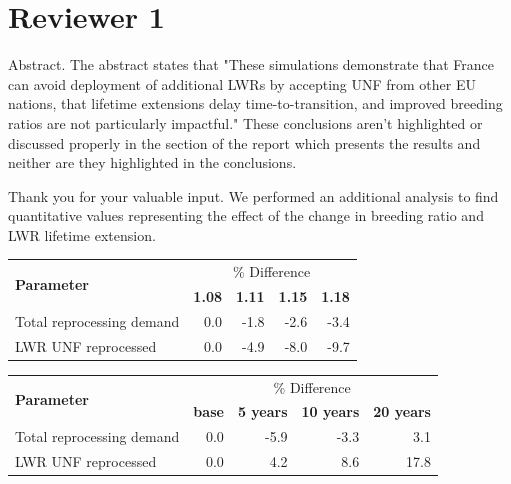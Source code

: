 \documentclass[answers,11pt]{exam}
\begin{document}
\section*{Reviewer 1}
\begin{questions}

        \question Abstract. The abstract states that "These simulations 
        demonstrate that France can avoid deployment of additional LWRs by 
        accepting UNF from other EU nations, that lifetime extensions delay 
        time-to-transition, and improved breeding ratios are not particularly 
        impactful." These conclusions aren't highlighted or discussed properly 
        in the section of the report which presents the results and neither are 
        they highlighted in the conclusions.  

        \begin{solution}
        	Thank you for your valuable input. We performed an additional
        	analysis to find quantitative values representing the effect
        	of the change in breeding ratio and LWR lifetime extension.
        	 
        	 \begin{tabular}{lrrrr}
        	 	\hline
        	 	\multirow{2}{*}{\textbf{Parameter}} & \multicolumn{4}{c}{\% Difference} \\
        	 	& \textbf{1.08}& \textbf{1.11} & \textbf{1.15} & \textbf{1.18} \\
        	 	\hline
        	 	Total reprocessing demand & 0.0 & -1.8 & -2.6 & -3.4 \\ 
        	 	LWR UNF reprocessed & 0.0  & -4.9 & -8.0 & -9.7 \\
        	 	\hline
        	 \end{tabular}
        	 
        	 \begin{tabular}{lrrrr}
        	 	\hline
        	 	\multirow{2}{*}{\textbf{Parameter}} & \multicolumn{4}{c}{\% Difference} \\
        	 	& \textbf{base}& \textbf{5 years} & \textbf{10 years} & \textbf{20 years} \\
        	 	\hline
        	 	Total reprocessing demand & 0.0 & -5.9 & -3.3 & 3.1 \\
        	 	LWR UNF reprocessed & 0.0  & 4.2 & 8.6 & 17.8 \\
        	 	\hline
        	 \end{tabular}
        \end{solution}


\end{questions}
\end{document}
